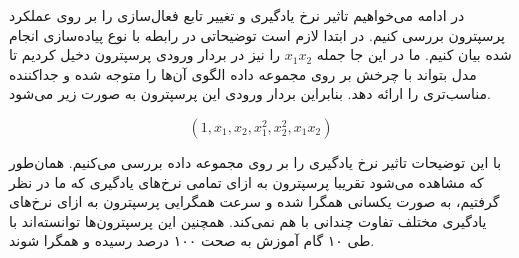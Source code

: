 \documentclass[12pt, a4paper]{article}
\begin{document}
در ادامه می‌خواهیم تاثیر نرخ‌ یادگیری و تغییر تابع فعال‌سازی را بر روی عملکرد پرسپترون بررسی کنیم.
در ابتدا لازم است توضیحاتی در رابطه با نوع پیاده‌سازی انجام شده بیان کنیم. ما در این جا جمله
$x_1x_2$ را نیز در بردار ورودی پرسپترون دخیل کردیم تا مدل بتواند با چرخش بر روی مجموعه داده
الگوی آن‌ها را متوجه شده و جداکننده مناسب‌تری را ارائه دهد. بنابراین بردار ورودی این پرسپترون
به صورت زیر می‌شود.

$$(1, x_1, x_2, x_1^2, x_2^2, x_1x_2)$$

با این توضیحات تاثیر نرخ یادگیری را بر روی مجموعه داده بررسی می‌کنیم. همان‌طور که مشاهده می‌شود
تقریبا پرسپترون به ازای تمامی نرخ‌های یادگیری که ما در نظر گرفتیم، به صورت یکسانی همگرا شده و
سرعت همگرایی پرسپترون به ازای نرخ‌های یادگیری مختلف تفاوت چندانی با هم نمی‌کند. همچنین
این پرسپترون‌ها توانسته‌اند با طی ۱۰ گام آموزش به صحت ۱۰۰ درصد رسیده و همگرا شوند.
\end{document}
